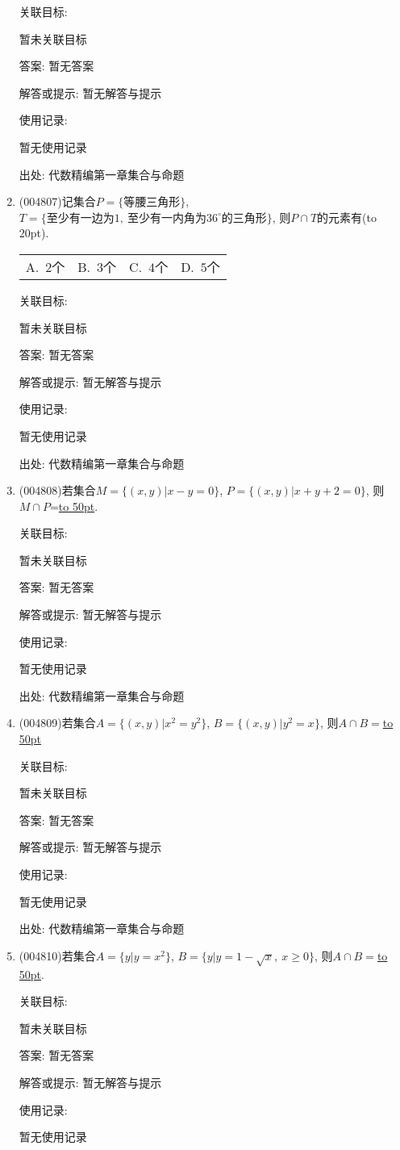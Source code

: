 \documentclass[10pt,a4paper]{article}
\newcommand{\blank}[1]{\underline{\hbox to #1pt{}}}
\newcommand{\bracket}[1]{(\hbox to #1pt{})}
\newcommand{\fourch}[4]{\par\begin{tabular}{p{.23\textwidth}p{.23\textwidth}p{.23\textwidth}p{.23\textwidth}}
A.~#1 &B.~#2& C.~#3& D.~#4
\end{tabular}}
\begin{document}
\begin{enumerate}[1.]
关联目标:

暂未关联目标

答案: 暂无答案

解答或提示: 暂无解答与提示

使用记录:

暂无使用记录


出处: 代数精编第一章集合与命题
\item { (004807)}记集合$P=\{\text{等腰三角形}\}$, $T=\{\text{至少有一边为}1, \ \text{至少有一内角为}36^\circ\text{的三角形}\}$, 则$P\cap T$的元素有\bracket{20}.
\fourch{$2$个}{$3$个}{$4$个}{$5$个}


关联目标:

暂未关联目标

答案: 暂无答案

解答或提示: 暂无解答与提示

使用记录:

暂无使用记录


出处: 代数精编第一章集合与命题
\item { (004808)}若集合$M=\{(x,y)|x-y=0\}$, $P=\{(x,y)|x+y+2=0\}$, 则$M\cap P$=\blank{50}.


关联目标:

暂未关联目标

答案: 暂无答案

解答或提示: 暂无解答与提示

使用记录:

暂无使用记录


出处: 代数精编第一章集合与命题
\item { (004809)}若集合$A=\{(x,y)|x^2=y^2\}$, $B=\{(x,y)|y^2=x\}$, 则$A\cap B=$\blank{50}


关联目标:

暂未关联目标

答案: 暂无答案

解答或提示: 暂无解答与提示

使用记录:

暂无使用记录


出处: 代数精编第一章集合与命题
\item { (004810)}若集合$A=\{y|y =x^2\}$, $B=\{y|y=1-\sqrt x, \ x\ge 0\}$, 则$A\cap B=$\blank{50}.


关联目标:

暂未关联目标

答案: 暂无答案

解答或提示: 暂无解答与提示

使用记录:

暂无使用记录



\end{enumerate}
\end{document}
